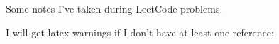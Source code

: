 \documentclass[12pt,a4paper]{report}
\begin{document}
Some notes I've taken during LeetCode problems.

I will get latex warnings if I don't have at least one reference:
\cite{wiki_templatecpp}






\appendix
{}

%
%
%
%
%
%

%



% 
% 

\printbibliography[prenote=myprenote]










 
 
\end{document}
